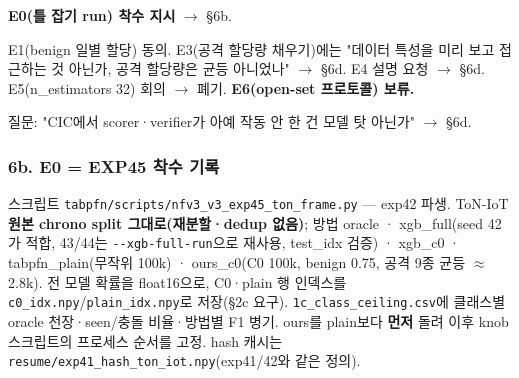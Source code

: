 \par\noindent \textbullet\enspace \textbf{E0(틀 잡기 run) 착수 지시}  \ensuremath{\rightarrow}  §6b.


\par\noindent \textbullet\enspace E1(benign 일별 할당) 동의. E3(공격 할당량 채우기)에는 "데이터 특성을 미리 보고 접근하는 것 아닌가, 공격 할당량은 균등 아니었나"  \ensuremath{\rightarrow}  §6d. E4 설명 요청  \ensuremath{\rightarrow}  §6d. E5(n\_\allowbreak{}estimators 32) 회의  \ensuremath{\rightarrow}  폐기. \textbf{E6(open-set 프로토콜) 보류.}


\par\noindent \textbullet\enspace 질문: "CIC에서 scorer·verifier가 아예 작동 안 한 건 모델 탓 아닌가"  \ensuremath{\rightarrow}  §6d.


\subsubsection{6b. E0 =\allowbreak{} EXP45 착수 기록}
\par\noindent \textbullet\enspace 스크립트 \texttt{tabpfn/\allowbreak{}\allowbreak{}s\allowbreak{}cripts/\allowbreak{}\allowbreak{}n\allowbreak{}fv3\_\allowbreak{}\allowbreak{}v3\_\allowbreak{}\allowbreak{}e\allowbreak{}xp45\_\allowbreak{}\allowbreak{}ton\allowbreak{}\_\allowbreak{}\allowbreak{}frame.\allowbreak{}p\allowbreak{}y} — exp42 파생. ToN-IoT \textbf{원본 chrono split 그대로(재분할·dedup 없음)}; 방법 oracle · xgb\_\allowbreak{}full(seed 42가 적합, 43/\allowbreak{}44는 \texttt{-\allowbreak{}-\allowbreak{}xgb-\allowbreak{}fu\allowbreak{}ll-\allowbreak{}run}으로 재사용, test\_\allowbreak{}idx 검증) · xgb\_\allowbreak{}c0 · tabpfn\_\allowbreak{}plain(무작위 100k) · ours\_\allowbreak{}c0(C0 100k, benign 0.75, 공격 9종 균등 \ensuremath{\approx}2.8k). 전 모델 확률을 float16으로, C0·plain 행 인덱스를 \texttt{c0\_\allowbreak{}\allowbreak{}idx.\allowbreak{}n\allowbreak{}py}/\allowbreak{}\texttt{plain\_\allowbreak{}\allowbreak{}id\allowbreak{}x.\allowbreak{}npy}로 저장(§2c 요구). \texttt{1c\_\allowbreak{}\allowbreak{}class\allowbreak{}\_\allowbreak{}\allowbreak{}ceiling\allowbreak{}.\allowbreak{}csv}에 클래스별 oracle 천장·seen/\allowbreak{}충돌 비율·방법별 F1 병기. ours를 plain보다 \textbf{먼저} 돌려 이후 knob 스크립트의 프로세스 순서를 고정. hash 캐시는 \texttt{resume/\allowbreak{}\allowbreak{}e\allowbreak{}xp41\_\allowbreak{}\allowbreak{}has\allowbreak{}h\_\allowbreak{}\allowbreak{}ton\_\allowbreak{}\allowbreak{}io\allowbreak{}t.\allowbreak{}npy}(exp41/\allowbreak{}42와 같은 정의).


